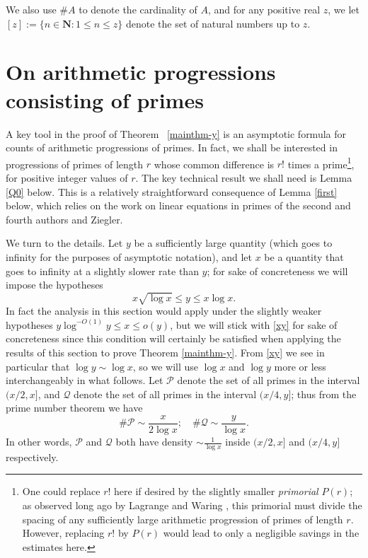 \documentclass[11pt]{amsart}
\numberwithin{equation}{section}  %
\theoremstyle{remark}
\theoremstyle{plain}
\numberwithin{equation}{section}
\renewcommand{\leq}{\leqslant}
\renewcommand{\(}{\left(}
\renewcommand{\)}{\right)}
\newcommand{\asym}{\sim}   %
\newcommand{\PP}{\mathcal{P}}
\newcommand{\QQ}{\mathcal{Q}}
\begin{document}
We also use $\# A$ to denote the cardinality of $A$, and
for any positive real $z$, we let $[z] := \{ n \in \mathbf{N}: 1 \leq
n \leq z \}$ denote the set of natural numbers up to $z$.


%
\section{On arithmetic progressions consisting of primes}\label{sec:prime-progressions}
%

A key tool in the proof of Theorem ~\ref{mainthm-y} is an asymptotic formula
for counts of arithmetic progressions of primes. In fact, we shall be
interested in progressions of primes of length $r$ whose common
difference is $r!$ times a prime\footnote{One could replace $r!$ here
  if desired by the slightly smaller \emph{primorial} $P(r)$; 
as observed long ago by Lagrange and Waring \cite{dickson}, this primorial must divide the spacing of any sufficiently large arithmetic progression of primes of length $r$.  However, replacing $r!$ by $P(r)$ would lead to only a negligible savings in the estimates here.}, for positive integer values of
$r$. The key technical result we shall need is Lemma \ref{Q0} below. 
This is a relatively straightforward consequence of Lemma \ref{first} below, which relies on the work on linear equations in primes of the second and fourth authors and Ziegler.

We turn to the details.  Let $y$ be a sufficiently large quantity (which goes to infinity for the purposes of asymptotic notation), and let $x$ be a quantity that goes to infinity at a slightly slower rate than $y$; for sake of concreteness we will impose the hypotheses
\begin{equation}\label{xy}
x \sqrt{\log x} \leq y \leq x \log x.
\end{equation}
In fact the analysis in this section would apply under the slightly weaker hypotheses $y \log^{-O(1)} y \leq x \leq o(y)$, but we will stick with \eqref{xy} for sake of concreteness since this condition will certainly be satisfied when applying the results of this section to prove Theorem \ref{mainthm-y}.
From \eqref{xy} we see in particular that $\log y \asym \log x$, so we will use $\log x$ and $\log y$ more or less interchangeably in what follows.
Let $\PP$ denote the set of all primes in the interval $(x/2,x]$, and $\QQ$ denote the set of all primes in the interval $(x/4, y]$; thus from the prime number theorem we have
\begin{equation}\label{pq}
\# \PP \asym \frac{x}{2\log x}; \quad \# \QQ \asym \frac{y}{\log x}.
\end{equation}
In other words, $\PP$ and $\QQ$ both have density $\asym \frac{1}{\log x}$ inside $(x/2,x]$ and $(x/4,y]$ respectively.
\end{document}

